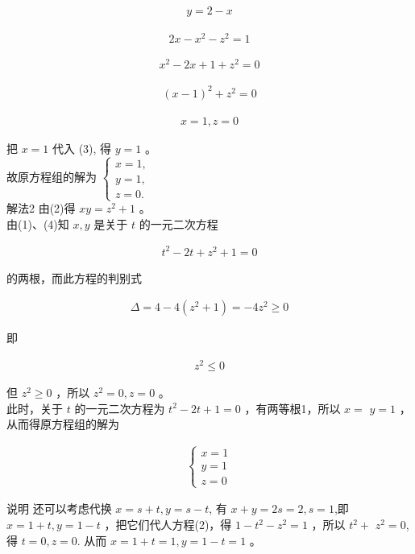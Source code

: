 \documentclass[10pt]{article}
\begin{document}
\begin{align*}
y=2-x \tag{3}
\end{align*}

\begin{align*}
2 x-x^{2}-z^{2}=1
\end{align*}

\begin{align*}
x^{2}-2 x+1+z^{2}=0
\end{align*}

\begin{align*}
(x-1)^{2}+z^{2}=0
\end{align*}

\begin{align*}
x=1, z=0
\end{align*}

把 $x=1$ 代入 (3), 得 $y=1$ 。\\
故原方程组的解为 $\left\{\begin{array}{l}x=1, \\ y=1, \\ z=0 .\end{array}\right.$\\
解法2 由(2)得 $x y=z^{2}+1$ 。\\
由(1)、(4)知 $x, y$ 是关于 $t$ 的一元二次方程

\begin{align*}
t^{2}-2 t+z^{2}+1=0
\end{align*}

的两根，而此方程的判别式

\begin{align*}
\Delta=4-4\left(z^{2}+1\right)=-4 z^{2} \geqslant 0
\end{align*}

即

\begin{align*}
z^{2} \leqslant 0
\end{align*}

但 $z^{2} \geqslant 0$ ，所以 $z^{2}=0, z=0$ 。\\
此时，关于 $t$ 的一元二次方程为 $t^{2}-2 t+1=0$ ，有两等根1，所以 $x=$ $y=1$ ，从而得原方程组的解为

\begin{align*}
\left\{\begin{array}{l}
x=1 \\
y=1 \\
z=0
\end{array}\right.
\end{align*}

说明 还可以考虑代换 $x=s+t, y=s-t$, 有 $x+y=2 s=2, s=1$,即 $x=1+t, y=1-t$ ，把它们代人方程(2)，得 $1-t^{2}-z^{2}=1$ ，所以 $t^{2}+$ $z^{2}=0$, 得 $t=0, z=0$. 从而 $x=1+t=1, y=1-t=1$ 。
\end{document}

